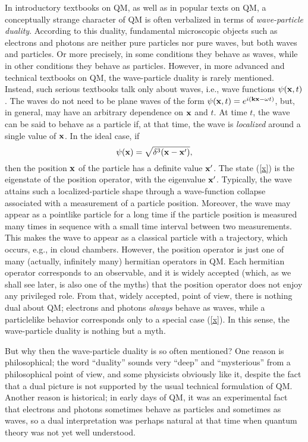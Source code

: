 \documentclass[12pt]{article}
\begin{document}
In introductory textbooks on QM, as well as in popular texts on 
QM, a conceptually strange character of QM is often verbalized 
in terms of {\it wave-particle duality}. According to this duality, 
fundamental microscopic objects such as electrons and photons 
are neither pure particles nor pure waves, but both waves and particles.
Or more precisely, in some conditions they behave as waves, 
while in other conditions they behave as particles.
However, in more advanced and technical textbooks on QM, 
the wave-particle duality is rarely mentioned. Instead, 
such serious textbooks talk only about waves, i.e., wave functions 
$\psi({\bf x},t)$. The waves do not need to be plane waves 
of the form $\psi({\bf x},t)=e^{i({\bf kx}-\omega t)}$, but, 
in general, may have an arbitrary dependence on ${\bf x}$ and 
$t$. At time $t$, the wave can be said to behave as a particle
if, at that time, the wave is {\em localized} 
around a single value of ${\bf x}$.
In the ideal case, if 
\begin{equation}\label{x}
\psi({\bf x})=\sqrt{\delta^3({\bf x}-{\bf x}')} ,
\end{equation}
then the position ${\bf x}$ of the particle has a definite 
value ${\bf x}'$.
The state (\ref{x}) is the eigenstate of the position operator, 
with the eigenvalue ${\bf x}'$. 
%
Typically, the wave attains such a localized-particle shape through
a wave-function collapse associated with a measurement of a 
particle position. Moreover, the wave may appear as a pointlike
particle for a long time if the particle position is measured
many times in sequence with a small time interval between two 
measurements. This makes the wave to appear as a classical particle 
with a trajectory, which occurs, e.g., in cloud chambers.  
%
However, the position operator 
is just one of many (actually, infinitely many) hermitian operators
in QM. Each hermitian operator corresponds to an observable, and
it is widely accepted (which, as we shall see later, is also one of 
the myths) that the position operator does not enjoy any privileged 
role. From that, widely accepted, point of view, there is nothing 
dual about QM; electrons and photons {\em always} behave as 
waves, while a particlelike behavior corresponds only to a 
special case (\ref{x}). In this sense, the wave-particle duality is 
nothing but a myth.

But why then the wave-particle duality is so often mentioned?
One reason is philosophical; the word ``duality'' sounds 
very ``deep'' and ``mysterious'' from a philosophical point of view, 
and some physicists obviously like it, despite the fact 
that a dual picture is not supported by the usual technical 
formulation of QM.  
Another reason is historical; in early days of QM, 
it was an experimental fact that electrons and photons 
sometimes behave as particles and sometimes as waves,
so a dual interpretation was perhaps natural at that time
when quantum theory was not yet well understood.    
\end{document}
